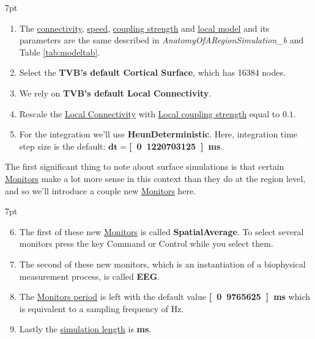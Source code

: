 \documentclass{tufte-handout}
\newenvironment{simulation}{%
  \def\FrameCommand{%
    \hspace{1pt}%
    {\color{ForestGreen}\vrule width 2pt}%
    {\color{simulationshade}\vrule width 4pt}%
    \colorbox{simulationshade}%
  }%
  \MakeFramed{\advance\hsize-\width\FrameRestore}%
  \noindent\hspace{-4.55pt}%
  \begin{adjustwidth}{}{7pt}%
  \vspace{2pt}\vspace{2pt}%
}
{%
  \vspace{2pt}\end{adjustwidth}\endMakeFramed%
}
\begin{document}
\begin{simulation}
\begin{enumerate}
\item The \underline{connectivity}, \underline{speed}, \underline{coupling strength} and \underline{local model} and its parameters are the same described in  \textit{AnatomyOfARegionSimulation\_b} and Table \ref{tab:modeltab}.
\item Select the \textbf{TVB's default Cortical Surface}, which has 16384 nodes. 
\item We rely on \textbf{TVB's default Local Connectivity}.
\item Rescale the \underline{Local Connectivity} with \underline{Local coupling strength} equal to $\mathbf{0.1}$.
\item For the integration we'll use \textbf{HeunDeterministic}.  Here, integration time step size is the default: $\mathbf{dt=}$\textbf{\unit[0.1220703125]{ms}}.
\end{enumerate}
\end{simulation}

The first significant thing to note about surface simulations is that certain \underline{Monitors} make a lot more sense in this context than they do at the region level, and so we'll introduce a couple new \underline{Monitors} here.

\begin{simulation}
\begin{enumerate}[resume]
\setcounter{enumi}{5}
\item The first of these new \underline{Monitors} is called
\textbf{{SpatialAverage}}. To select several monitors press the key Command or Control while you select them.
\item The second of these new monitors, which is an instantiation of a
biophysical measurement process, is called \textbf{EEG}. 
\item The \underline{Monitors period} is left with the default value \textbf{\unit[0.9765625]{ms}} which is equivalent to a sampling frequency of \unit[512]{Hz}.
\item Lastly the \underline{simulation length} is \textbf{\unit[2000]{ms}}.
\end{enumerate}
\end{simulation}
\end{document}
